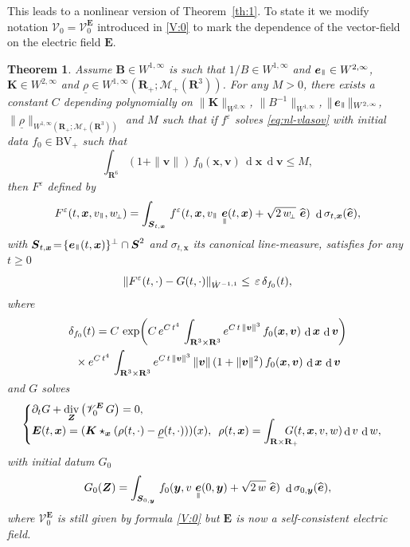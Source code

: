 \documentclass[10pt]{amsart}
\let\mathcal\mathscr
\newenvironment{splitcases}
{\begin{cases}\begin{aligned}}
{\end{aligned}\end{cases}}
\newcommand{\sperp}{{\scriptscriptstyle\perp}}
\newcommand{\BV}{\mathrm{BV}}
\let\eps\varepsilon
\let\d\partial
\DeclareMathOperator\dD{d}\let\dd\dD
\DeclareMathOperator{\Div}{div}
\theoremstyle{plain}
\newtheorem{theorem}{Theorem}[section]
\theoremstyle{definition}
\newcommand{\be}{\begin{equation}}
\newcommand{\ee}{\end{equation}}
\newcommand{\bt}{\begin{theorem}}
\newcommand{\et}{\end{theorem}}
\newcommand\R{\mathbf R}
\newcommand\bB{{\boldsymbol B}}
\newcommand\bE{{\boldsymbol E}}
\newcommand\bK{{\boldsymbol K}}
\newcommand\bS{{\boldsymbol S}}
\newcommand\bfv{{\boldsymbol v}}
\newcommand\bfx{{\boldsymbol x}}
\newcommand\bfy{{\boldsymbol y}}
\newcommand\bfZ{{\boldsymbol Z}}
\newcommand\urho{{\underline \rho}}
\newcommand\cM{{\mathcal M}}
\newcommand\cV{{\mathcal V}}
\DeclareMathOperator{\beD}{\boldsymbol{e}}
\newcommand\eDpar{\beD_\mypar}
\newcommand\eperp{w_{\!\sperp}}
\let\e w
\newcommand{\mypar}{{\mkern3mu\vphantom{\perp}\vrule depth 0pt\mkern2mu\vrule depth 0pt\mkern3mu}}
\begin{document}
This leads to a nonlinear version of Theorem~\ref{th:1}. To state it we modify notation $\cV_0=\cV_0^\bE$ introduced in \eqref{V:0} to mark the dependence of the vector-field on the electric field $\bE$.

\bt\label{th:1-nl}
Assume $\bB\in W^{1,\infty}$ is such that $1/B\in W^{1,\infty}$ and $\eDpar\in W^{2,\infty}$, $\bK\in W^{2,\infty}$ and $\urho\in W^{1,\infty}(\R_+;\cM_+(\R^3))$. For any $M>0$, there exists a constant $C$ depending polynomially on $\|\bK\|_{W^{2,\infty}}$, $\|B^{-1}\|_{W^{1,\infty}}$, $\|\eDpar\|_{W^{2,\infty}}$, $\|\urho\|_{W^{1,\infty}(\R_+;\cM_+(\R^3))}$ and $M$ such that if $f^\eps$ solves \eqref{eq:nl-vlasov} with initial data $f_0\in \BV_+$ such that
\[
\int_{\R^6}(1+\|\bfv\|)\,f_0(\bfx,\bfv)\,\dD \bfx\,\dD \bfv\leq M,
\]
then $F^\eps$ defined by
\[
F^\eps(t,\bfx,v_\mypar,\eperp)=\int_{\bS_{t,\bfx}}\,f^\eps(t,\bfx,v_\mypar\,\eDpar(t,\bfx)+\sqrt{2\,\eperp}\ \widehat{\beD})\ \dD \sigma_{t,\bfx}(\widehat{\beD}),
\]
with $\bS_{t,\bfx}\!=\!\{\eDpar(t,\bfx)\}^\perp\cap\bS^2$ and $\sigma_{t,\bfx}$ its canonical line-measure, satisfies for any $t\!\geq\!0$\vspace*{-3pt}
\[
\|F^\eps(t,\cdot)-G(t,\cdot)\|_{\dot{W}^{-1,1}}\leq \,\eps\,\delta_{f_0}(t),\vspace*{-3pt}
\]
where\vspace*{-3pt}\enlargethispage{\baselineskip}%
\begin{multline*}
\delta_{f_0}(t)=
C\,\exp\biggl(C\,e^{C\,t^4}\,\int_{\R^3\times\R^3} e^{C\,t\,\|\bfv\|^3}\,f_0(\bfx,\bfv)\,\dD\bfx\,\dD\bfv\biggr)\\
{}\times e^{C\,t^4}\,\int_{\R^3\times\R^3} e^{C\,t\,\|\bfv\|^3}\,\|\bfv\|\,(1+\|\bfv\|^2)\,f_0(\bfx,\bfv)\,\dD\bfx\,\dD\bfv\vspace*{-3pt}
\end{multline*}
and $G$ solves
\be\label{eq:1st-nl}
\begin{splitcases}
&\d_t G+\Div_\bfZ \left(\cV_0^\bE\,G \right) =0,\\[-5pt]
&\bE(t,\bfx)=(\bK\star_{\bfx}(\rho(t,\cdot)-\urho(t,\cdot)))(x),\ \,
\rho(t,\bfx)=\int_{\R\times\R_+}\hspace*{-5mm}G(t,\bfx,v,w)\dD v\,\dD w,
\end{splitcases}
\ee
with initial datum $G_0$
\be
\label{eq:1st-nlG0}
G_0(\bfZ)=\int_{\bS_{0,\bfy}}\,f_0(\bfy,v\,\eDpar(0,\bfy)+\sqrt{2\,\e}\ \widehat{\beD})\ \dD \sigma_{0,\bfy}(\widehat{\beD}),
\ee
where $\cV_0^\bE$ is still given by formula \eqref{V:0} but $\bE$ is now a self-consistent electric field.
\et
\end{document}
